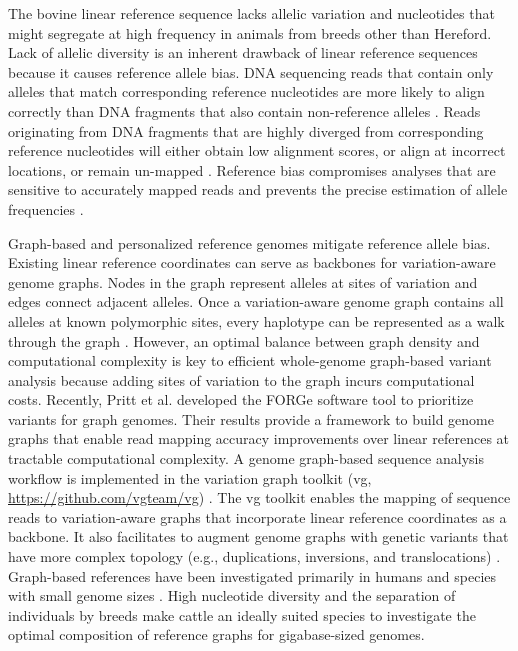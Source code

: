 \documentclass[../main.tex]{subfiles}
\begin{document}
The bovine linear reference sequence lacks allelic variation and nucleotides that might segregate at high frequency in animals from breeds other than Hereford. Lack of allelic diversity is an inherent drawback of linear reference sequences because it causes reference allele bias. DNA sequencing reads that contain only alleles that match corresponding reference nucleotides are more likely to align correctly than DNA fragments that also contain non-reference alleles \citep{van2015wasp,paten2017genome}. Reads originating from DNA fragments that are highly diverged from corresponding reference nucleotides will either obtain low alignment scores, or align at incorrect locations, or remain un-mapped \citep{pritt2018forge}. Reference bias compromises analyses that are sensitive to accurately mapped reads and prevents the precise estimation of allele frequencies \citep{van2015wasp,gunther2019presence,salavati2019elimination,degner2009effect}.

Graph-based \citep{garrison2018variation,paten2017genome} and personalized reference genomes \citep{ballouz2019time,groza2020personalized} mitigate reference allele bias. Existing linear reference coordinates can serve as backbones for variation-aware genome graphs. Nodes in the graph represent alleles at sites of variation and edges connect adjacent alleles. Once a variation-aware genome graph contains all alleles at known polymorphic sites, every haplotype can be represented as a walk through the graph \citep{siren2020haplotype}. However, an optimal balance between graph density and computational complexity is key to efficient whole-genome graph-based variant analysis because adding sites of variation to the graph incurs computational costs. Recently, Pritt et al. \citep{pritt2018forge} developed the FORGe software tool to prioritize variants for graph genomes. Their results provide a framework to build genome graphs that enable read mapping accuracy improvements over linear references at tractable computational complexity. A genome graph-based sequence analysis workflow is implemented in the variation graph toolkit (vg, \url{https://github.com/vgteam/vg}) \citep{garrison2018variation}. The vg toolkit enables the mapping of sequence reads to variation-aware graphs that incorporate linear reference coordinates as a backbone. It also facilitates to augment genome graphs with genetic variants that have more complex topology (e.g., duplications, inversions, and translocations) \citep{hickey2020genotyping}. Graph-based references have been investigated primarily in humans and species with small genome sizes \citep{paten2017genome}. High nucleotide diversity and the separation of individuals by breeds make cattle an ideally suited species to investigate the optimal composition of reference graphs for gigabase-sized genomes.
\end{document}
